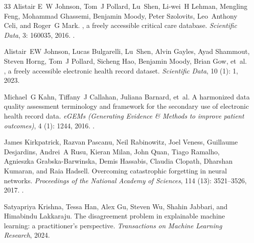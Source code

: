 \documentclass[10pt,a4paper,twocolumn]{article}
\begin{document}
\begin{thebibliography}{33}
		Alistair E~W Johnson, Tom~J Pollard, Lu~Shen, Li-wei~H Lehman, Mengling Feng,
		Mohammad Ghassemi, Benjamin Moody, Peter Szolovits, Leo~Anthony Celi, and
		Roger~G Mark.
		, a freely accessible critical care database.
		\newblock \emph{Scientific Data}, 3: 160035, 2016.
		\newblock {}.
		
		Alistair~EW Johnson, Lucas Bulgarelli, Lu~Shen, Alvin Gayles, Ayad Shammout,
		Steven Horng, Tom~J Pollard, Sicheng Hao, Benjamin Moody, Brian Gow, et~al.
		, a freely accessible electronic health record dataset.
		\newblock \emph{Scientific Data}, 10 (1): 1, 2023.
		
		Michael~G Kahn, Tiffany~J Callahan, Juliana Barnard, et~al.
		\newblock A harmonized data quality assessment terminology and framework for
		the secondary use of electronic health record data.
		\newblock \emph{eGEMs (Generating Evidence \& Methods to improve patient
			outcomes)}, 4\penalty0 (1): 1244, 2016.
		\newblock {}.
		
		James Kirkpatrick, Razvan Pascanu, Neil Rabinowitz, Joel Veness, Guillaume
		Desjardins, Andrei~A Rusu, Kieran Milan, John Quan, Tiago Ramalho, Agnieszka
		Grabska-Barwinska, Demis Hassabis, Claudia Clopath, Dharshan Kumaran, and
		Raia Hadsell.
		\newblock Overcoming catastrophic forgetting in neural networks.
		\newblock \emph{Proceedings of the National Academy of Sciences}, 114
		(13): 3521--3526, 2017.
		\newblock {}.
		
		Satyapriya Krishna, Tessa Han, Alex Gu, Steven Wu, Shahin Jabbari, and
		Himabindu Lakkaraju.
		\newblock The disagreement problem in explainable machine learning: a
		practitioner's perspective.
		\newblock \emph{Transactions on Machine Learning Research}, 2024.
		

\end{thebibliography}
\end{document}
